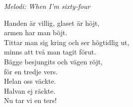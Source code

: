 {\footnotesize\textit{Melodi: When I'm sixty-four}}\par
\vspace{10pt}
Handen är villig, glaset är höjt,\\
armen har man böjt.\\
Tittar man sig kring och ser högtidlig ut,\\
minns att två man tagit förut.\\
Bägge besjungits och vägen röjt,\\
för en tredje vers.\\
Helan oss väckte.\\
Halvan ej räckte.\\
Nu tar vi en ters!

